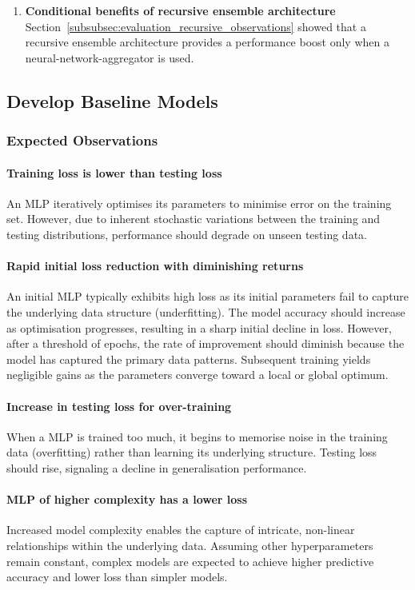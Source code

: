 \begin{enumerate}
    \item \textbf{Conditional benefits of recursive ensemble architecture} \\
    Section~\ref{subsubsec:evaluation_recursive_observations} showed that a recursive ensemble architecture provides a performance boost only when a neural-network-aggregator is used. 
\end{enumerate}


\subsection{Develop Baseline Models}
\label{subsec:evaluation_baseline}
\subsubsection{Expected Observations}
\paragraph{Training loss is lower than testing loss}
An MLP iteratively optimises its parameters to minimise error on the training set. However, due to inherent stochastic variations between the training and testing distributions, performance should degrade on unseen testing data. 

\paragraph{Rapid initial loss reduction with diminishing returns}
An initial MLP typically exhibits high loss as its initial parameters fail to capture the underlying data structure (underfitting). The model accuracy should increase as optimisation progresses, resulting in a sharp initial decline in loss. However, after a threshold of epochs, the rate of improvement should diminish because the model has captured the primary data patterns. Subsequent training yields negligible gains as the parameters converge toward a local or global optimum. 

\paragraph{Increase in testing loss for over-training}
When a MLP is trained too much, it begins to memorise noise in the training data (overfitting) rather than learning its underlying structure. Testing loss should rise, signaling a decline in generalisation performance. 

\paragraph{MLP of higher complexity has a lower loss}
Increased model complexity enables the capture of intricate, non-linear relationships within the underlying data. Assuming other hyperparameters remain constant, complex models are expected to achieve higher predictive accuracy and lower loss than simpler models. 

